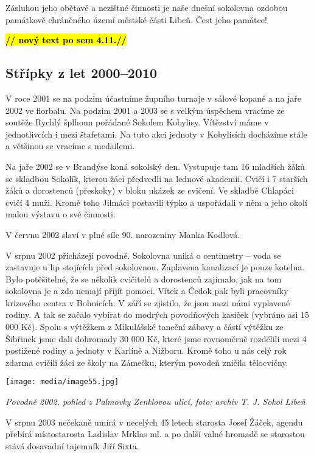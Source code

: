 Zásluhou jeho obětavé a nezištné činnosti je naše dnešní sokolovna
ozdobou památkově chráněného území městské části Libeň. Čest jeho
památce!

\textbf{\hl{// nový text po sem 4.11.//}}

\subsection{Střípky z let
2000--2010}\label{stux159uxedpky-z-let-20002010}

V roce 2001 se na podzim účastníme župního turnaje v sálové kopané a na
jaře 2002 ve florbalu. Na podzim 2001 a 2003 se s velkým úspěchem
vracíme ze soutěže Rychlý šplhoun pořádané Sokolem Kobylisy. Vítězství
máme v jednotlivcích i mezi štafetami. Na tuto akci jednoty v Kobylisích
docházíme stále a většinou se vracíme s medailemi.

Na jaře 2002 se v Brandýse koná sokolský den. Vystupuje tam 16 mladších
žáků se skladbou Sokolík, kterou žáci předvedli na lednové akademii.
Cvičí i 7 starších žáků a dorostenců (přeskoky) v bloku ukázek ze
cvičení. Ve skladbě Chlapáci cvičí 4 muži. Kromě toho Jilmáci postavili
týpko a uspořádali v něm a jeho okolí malou výstavu o své činnosti.

V červnu 2002 slaví v plné síle 90. narozeniny Manka Kodlová.

V srpnu 2002 přicházejí povodně. Sokolovna uniká o centimetry -- voda se
zastavuje u lip stojících před sokolovnou. Zaplavena kanalizací je pouze
kotelna. Bylo potěšitelné, že se několik cvičitelů a dorostenců
zajímalo, jak na tom sokolovna je a zda nemají přijít pomoci. Vítek a
Čedok pak byli pracovníky krizového centra v Bohnicích. V září se
zjistilo, že jsou mezi námi vyplavené rodiny. A tak se začalo vybírat do
modrých povodňových kasiček (vybráno asi 15 000 Kč). Spolu s výtěžkem z
Mikulášské taneční zábavy a částí výtěžku ze Šibřinek jsme dali
dohromady 30 000 Kč, které jsme rovnoměrně rozdělili mezi 4 postižené
rodiny a jednoty v Karlíně a Nižboru. Kromě toho u nás celý rok zdarma
cvičili žáci ze školy na Zámečku, kterým povodeň zničila tělocvičny.

\texttt{[image: media/image55.jpg]}

\emph{Povodně 2002, pohled z Palmovky Zenklovou ulicí, foto: archiv T.
J. Sokol Libeň}

V srpnu 2003 nečekaně umírá v necelých 45 letech starosta Josef Žáček,
agendu přebírá místostarosta Ladislav Mrklas ml. a po další valné
hromadě se starostou stává dosavadní tajemník Jiří Sixta.

